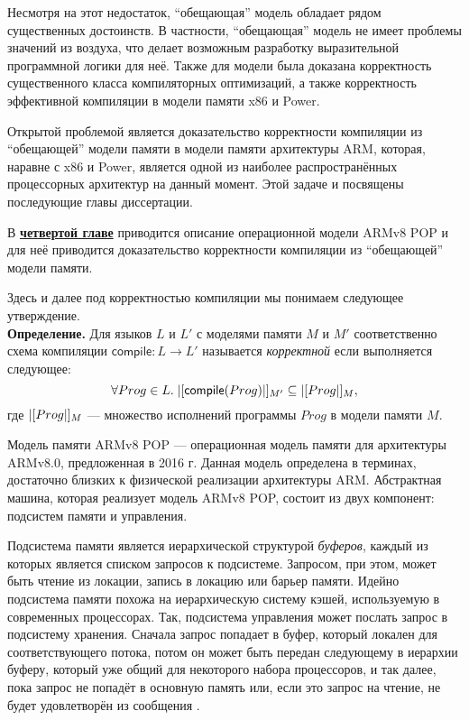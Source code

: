 Несмотря на этот недостаток, ``обещающая'' модель обладает рядом существенных достоинств.
В частности, ``обещающая'' модель не имеет проблемы значений из воздуха, что делает возможным разработку
выразительной программной логики для неё. Также для модели была доказана корректность существенного класса компиляторных
оптимизаций, а также корректность эффективной компиляции в модели памяти x86 и Power.

Открытой проблемой является доказательство корректности компиляции из ``обещающей'' модели памяти в модели памяти архитектуры
ARM, которая, наравне с x86 и Power, является одной из наиболее распространённых процессорных архитектур на данный момент.
Этой задаче и посвящены последующие главы диссертации.

В \underline{\textbf{четвертой главе}} приводится описание операционной модели ARMv8 POP и для неё
приводится доказательство корректности компиляции из ``обещающей'' модели памяти.

Здесь и далее под корректностью компиляции мы понимаем следующее утверждение.\\
\textbf{Определение.} Для языков $L$ и $L'$ с моделями памяти $M$ и $M'$ соответственно схема компиляции $\textsf{compile} : L \rightarrow L'$
называется \emph{корректной} если выполняется следующее:
\[ \forall Prog \in L. \; |[\textsf{compile}(Prog)|]_{M'} \subseteq |[Prog|]_{M}, \]
где $|[Prog|]_{M}$ --- множество исполнений программы $Prog$ в модели памяти $M$.

Модель памяти ARMv8 POP --- операционная модель памяти для архитектуры ARMv8.0, предложенная в 2016 г.
Данная модель определена в терминах, достаточно близких к физической реализации архитектуры ARM.
Абстрактная машина, которая реализует модель ARMv8 POP, состоит из двух компонент: подсистем памяти и управления.

Подсистема памяти является иерархической структурой \emph{буферов}, каждый из которых является списком запросов к подсистеме.
Запросом, при этом, может быть чтение из локации, запись в локацию или барьер памяти.
Идейно подсистема памяти похожа на иерархическую систему кэшей, используемую в современных процессорах.
Так, подсистема управления может послать запрос в подсистему хранения. Сначала запрос попадает в буфер, который локален
для соответствующего потока, потом он может быть передан следующему в иерархии буферу, который уже общий для некоторого
набора процессоров, и так далее, пока запрос не попадёт в основную память или, если это запрос на чтение, не будет
удовлетворён из сообщения .

